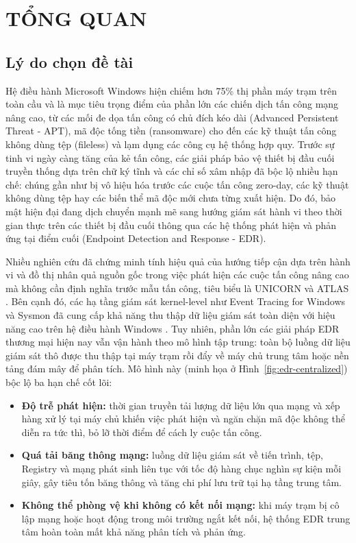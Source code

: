 \chapter{TỔNG QUAN}
\label{chap:tongquan}

\section{Lý do chọn đề tài}

Hệ điều hành Microsoft Windows hiện chiếm hơn 75\% thị phần máy trạm trên toàn cầu và là mục tiêu trọng điểm của phần lớn các chiến dịch tấn công mạng nâng cao, từ các mối đe dọa tấn công có chủ đích kéo dài (Advanced Persistent Threat - APT), mã độc tống tiền (ransomware) cho đến các kỹ thuật tấn công không dùng tệp (fileless) và lạm dụng các công cụ hệ thống hợp quy. Trước sự tinh vi ngày càng tăng của kẻ tấn công, các giải pháp bảo vệ thiết bị đầu cuối truyền thống dựa trên chữ ký tĩnh và các chỉ số xâm nhập đã bộc lộ nhiều hạn chế: chúng gần như bị vô hiệu hóa trước các cuộc tấn công zero-day, các kỹ thuật không dùng tệp hay các biến thể mã độc mới chưa từng xuất hiện. Do đó, bảo mật hiện đại đang dịch chuyển mạnh mẽ sang hướng giám sát hành vi theo thời gian thực trên các thiết bị đầu cuối thông qua các hệ thống phát hiện và phản ứng tại điểm cuối (Endpoint Detection and Response - EDR).

Nhiều nghiên cứu đã chứng minh tính hiệu quả của hướng tiếp cận dựa trên hành vi và đồ thị nhân quả nguồn gốc trong việc phát hiện các cuộc tấn công nâng cao mà không cần định nghĩa trước mẫu tấn công, tiêu biểu là UNICORN \cite{han2020unicorn} và ATLAS \cite{alsaheel2021atlas}. Bên cạnh đó, các hạ tầng giám sát kernel-level như Event Tracing for Windows và Sysmon đã cung cấp khả năng thu thập dữ liệu giám sát toàn diện với hiệu năng cao trên hệ điều hành Windows \cite{russinovich2021windows}. Tuy nhiên, phần lớn các giải pháp EDR thương mại hiện nay vẫn vận hành theo mô hình tập trung: toàn bộ luồng dữ liệu giám sát thô được thu thập tại máy trạm rồi đẩy về máy chủ trung tâm hoặc nền tảng đám mây để phân tích. Mô hình này (minh họa ở Hình~\ref{fig:edr-centralized}) bộc lộ ba hạn chế cốt lõi:

\begin{itemize}
    \item \textbf{Độ trễ phát hiện:} thời gian truyền tải lượng dữ liệu lớn qua mạng và xếp hàng xử lý tại máy chủ khiến việc phát hiện và ngăn chặn mã độc không thể diễn ra tức thì, bỏ lỡ thời điểm để cách ly cuộc tấn công.
    \item \textbf{Quá tải băng thông mạng:} luồng dữ liệu giám sát về tiến trình, tệp, Registry và mạng phát sinh liên tục với tốc độ hàng chục nghìn sự kiện mỗi giây, gây tiêu tốn băng thông và tăng chi phí lưu trữ tại hạ tầng trung tâm.
    \item \textbf{Không thể phòng vệ khi không có kết nối mạng:} khi máy trạm bị cô lập mạng hoặc hoạt động trong môi trường ngắt kết nối, hệ thống EDR trung tâm hoàn toàn mất khả năng phân tích và phản ứng.
\end{itemize}

